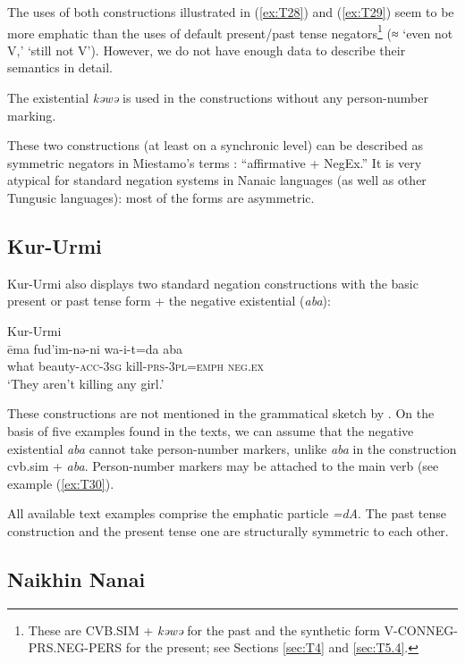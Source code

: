 \documentclass[output=paper]{langscibook}
\begin{document}
The uses of both constructions illustrated in (\ref{ex:T28}) and (\ref{ex:T29}) seem to be more emphatic than the uses of default present/past tense negators\footnote{These are CVB.SIM + \textit{kəwə} for the past and the synthetic form V-CONNEG-PRS.NEG-PERS for the present; see Sections \ref{sec:T4} and \ref{sec:T5.4}.} (≈ ‘even not V,’ ‘still not V’). However, we do not have enough data to describe their semantics in detail.

The existential \textit{kəwə} is used in the constructions without any person-number marking.

These two constructions (at least on a synchronic level) can be described as symmetric negators in Miestamo’s terms \citeyearpar{Miestamo2005}: “affirmative + NegEx.” It is very atypical for standard negation systems in Nanaic languages (as well as other Tungusic languages): most of the forms are asymmetric.

\subsection{Kur-Urmi}\label{sec:T6.3}

Kur-Urmi also displays two standard negation constructions with the basic present or past tense form + the negative existential (\textit{aba}):

\ea Kur-Urmi \label{ex:T30}\\
	\gll ēma	fud’im-nə-ni	wa-i-t=da	aba\\
	what	beauty-\textsc{acc-3sg}	kill-\textsc{prs-3pl=emph}	\textsc{neg.ex}\\
	\glt `They aren’t killing any girl.' \citep[141, text]{sunik1958a}
\z

These constructions are not mentioned in the grammatical sketch by \citet{sunik1958a}. On the basis of five examples found in the texts, we can assume that the negative existential \textit{aba} cannot take person-number markers, unlike \textit{aba} in the construction cvb.sim + \textit{aba}. Person-number markers may be attached to the main verb (see example (\ref{ex:T30}).

All available text examples comprise the emphatic particle \textit{=dA}. The past tense construction and the present tense one are structurally symmetric to each other.

\subsection{Naikhin Nanai}\label{sec:T6.4}
\end{document}

